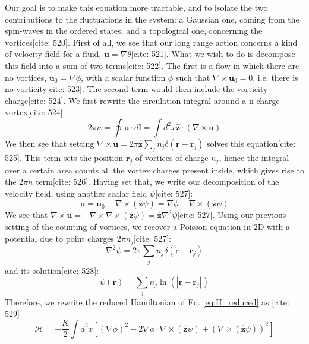 \documentclass[11pt]{article}
\begin{document}
Our goal is to make this equation more tractable, and to isolate the two contributions to the fluctuations in the system: a Gaussian one, coming from the spin-waves in the ordered states, and a topological one, concerning the vortices[cite: 520]. First of all, we see that our long range action concerns a kind of velocity field for a fluid, $\mathbf{u} = \nabla \theta$[cite: 521]. What we wish to do is decompose this field into a sum of two terms[cite: 522]. The first is a flow in which there are no vortices, $\mathbf{u}_0 = \nabla \phi$, with a scalar function $\phi$ such that $\nabla \times \mathbf{u}_0 = 0$, i.e. there is no vorticity[cite: 523]. The second term would then include the vorticity charge[cite: 524]. We first rewrite the circulation integral around a n-charge vortex[cite: 524].
\begin{equation}
2\pi n = \oint \mathbf{u} \cdot d\mathbf{l} = \int d^2x \hat{\mathbf{z}} \cdot (\nabla \times \mathbf{u}) \label{eq:circ_vorticity}
\end{equation}
We then see that setting $\nabla \times \mathbf{u} = 2\pi \hat{\mathbf{z}} \sum_j n_j \delta(\mathbf{r} - \mathbf{r}_j)$ solves this equation[cite: 525]. This term sets the position $\mathbf{r}_j$ of vortices of charge $n_j$, hence the integral over a certain area counts all the vortex charges present inside, which gives rise to the $2\pi n$ term[cite: 526]. Having set that, we write our decomposition of the velocity field, using another scalar field $\psi$[cite: 527]:
\begin{equation}
\mathbf{u} = \mathbf{u}_0 - \nabla \times (\hat{\mathbf{z}} \psi) = \nabla \phi - \nabla \times (\hat{\mathbf{z}} \psi) \label{eq:u_decomp}
\end{equation}
We see that $\nabla \times \mathbf{u} = -\nabla \times \nabla \times (\hat{\mathbf{z}} \psi) = \hat{\mathbf{z}} \nabla^2 \psi$[cite: 527]. Using our previous setting of the counting of vortices, we recover a Poisson equation in 2D with a potential due to point charges $2\pi n_j$[cite: 527]:
\begin{equation}
\nabla^2 \psi = 2\pi \sum_j n_j \delta(\mathbf{r} - \mathbf{r}_j) \label{eq:poisson_psi}
\end{equation}
and its solution[cite: 528]:
\begin{equation}
\psi(\mathbf{r}) = \sum_j n_j \ln(|\mathbf{r} - \mathbf{r}_j|) \label{eq:psi_sol}
\end{equation}
Therefore, we rewrite the reduced Hamiltonian of Eq. \eqref{eq:H_reduced} as [cite: 529]
\begin{equation}
\mathcal{H} = -\frac{K}{2} \int d^2x [(\nabla \phi)^2 - 2 \nabla \phi \cdot \nabla \times (\hat{\mathbf{z}} \psi) + (\nabla \times (\hat{\mathbf{z}} \psi))^2] \label{eq:H_decomp_terms}
\end{equation}
\end{document}
